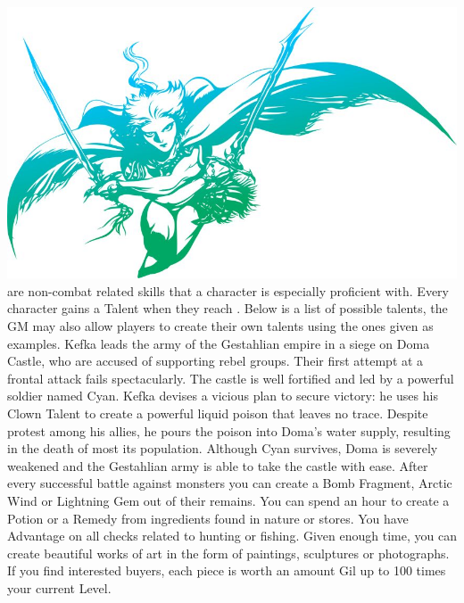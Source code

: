 %
\\
%
\includegraphics[width=\columnwidth]{./art/images/ff3.jpg}
%
\vfill
%
 are non-combat related skills that a character is especially proficient with.
Every character gains a Talent when they reach .
Below is a list of possible talents, the GM may also allow players to create their own talents using the ones given as examples.
%
\ofpar
%
{
	Kefka leads the army of the Gestahlian empire in a siege on Doma Castle, who are accused of supporting rebel groups.
	Their first attempt at a frontal attack fails spectacularly.
	The castle is well fortified and led by a powerful soldier named Cyan.
	Kefka devises a vicious plan to secure victory: 
	he uses his Clown Talent to create a powerful liquid poison that leaves no trace.
	Despite protest among his allies, he pours the poison into Doma's water supply, resulting in the death of most its population.
	Although Cyan survives, Doma is severely weakened and the Gestahlian army is able to take the castle with ease.
}	
%	
\ofpar\vfill
%
{
	After every successful battle against monsters you can create a Bomb Fragment, Arctic Wind or Lightning Gem out of their remains. 
}
\vfill
{}
{
	You can spend an hour to create a Potion or a Remedy from ingredients found in nature or stores.
}
\vfill
{}
{
	You have Advantage on all checks related to hunting or fishing.
}
\vfill
{}
{
	Given enough time, you can create beautiful works of art in the form of paintings, sculptures or photographs.
	If you find interested buyers, each piece is worth an amount Gil up to 100 times your current Level.
}
